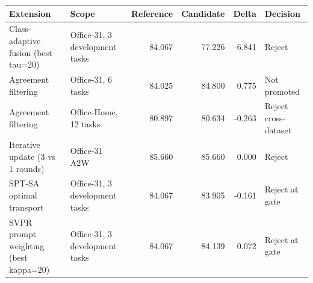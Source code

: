 \begin{tabular}{llrrrl}
\toprule
Extension & Scope & Reference & Candidate & Delta & Decision \\
\midrule
Class-adaptive fusion (best tau=20) & Office-31, 3 development tasks & 84.067 & 77.226 & -6.841 & Reject \\
Agreement filtering & Office-31, 6 tasks & 84.025 & 84.800 & 0.775 & Not promoted \\
Agreement filtering & Office-Home, 12 tasks & 80.897 & 80.634 & -0.263 & Reject cross-dataset \\
Iterative update (3 vs 1 rounds) & Office-31 A2W & 85.660 & 85.660 & 0.000 & Reject \\
SPT-SA optimal transport & Office-31, 3 development tasks & 84.067 & 83.905 & -0.161 & Reject at gate \\
SVPR prompt weighting (best kappa=20) & Office-31, 3 development tasks & 84.067 & 84.139 & 0.072 & Reject at gate \\
\bottomrule
\end{tabular}
